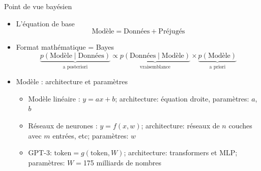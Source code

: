 \documentclass[presentation, aspectratio=169]{beamer}
\begin{document}
\begin{frame}{Point de vue bayésien}
  \begin{itemize}
  \item L'équation de base
    \begin{equation*}
      \text{Modèle} = \text{Données} + \text{Préjugés}
    \end{equation*}
  \item Format mathématique = Bayes
    \begin{equation*}
      \underbrace{p(\text{Modèle}\mid \text{Données})}_{\text{a posteriori}}
        \propto \underbrace{p(\text{Données}\mid\text{Modèle})}_{\text{vraisemblance}}
        \times
        \underbrace{p(\text{Modèle})}_{\text{a priori}}
    \end{equation*}
  \item Modèle : architecture et paramètres
    \begin{itemize}
    \item Modèle linéaire : $y = ax+b$; architecture:
      équation droite, paramètres: $a$, $b$
    \item Réseaux de neurones : $y = f(x, w)$; architecture: réseaux
      de $n$ couches avec $m$ entrées, etc; paramètres: $w$
    \item GPT-3: $\text{token} = g(\text{token}, W)$; architecture:
      transformers et MLP; paramètres: $W = $175 milliards de nombres
    \end{itemize}
  \end{itemize}
\end{frame}
\end{document}
